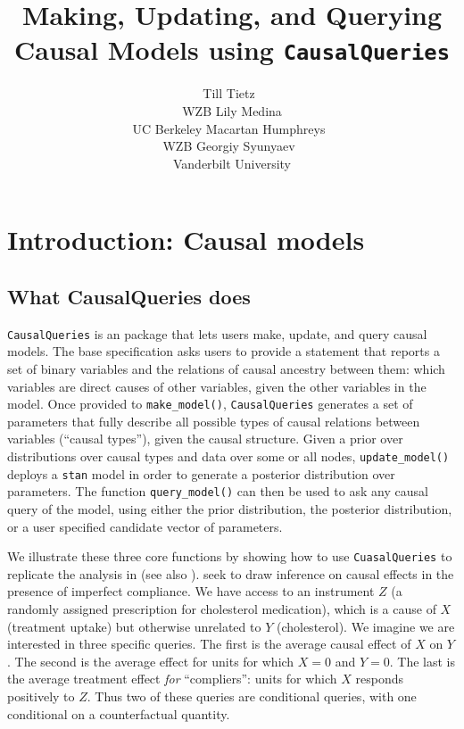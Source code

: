 \documentclass[
  11pt,
  article]{jss}
\author{Till Tietz~\orcidlink{0000-0002-2916-9059}\\WZB \And Lily
Medina\\UC Berkeley \AND Macartan
Humphreys~\orcidlink{0000-0001-7029-2326}\\WZB \And Georgiy
Syunyaev~\orcidlink{0000-0002-4391-6313}\\Vanderbilt University}
\title{Making, Updating, and Querying Causal Models using
\texttt{CausalQueries}}
\begin{document}
\maketitle
\hypertarget{sec-intro}{%
\section{Introduction: Causal models}\label{sec-intro}}

\hypertarget{what-causalqueries-does}{%
\subsection{What CausalQueries does}\label{what-causalqueries-does}}

\texttt{CausalQueries} is an  package that lets users make,
update, and query causal models. The base specification asks users to
provide a statement that reports a set of binary variables and the
relations of causal ancestry between them: which variables are direct
causes of other variables, given the other variables in the model. Once
provided to \texttt{make\_model()}, \texttt{CausalQueries} generates a
set of parameters that fully describe all possible types of causal
relations between variables (``causal types''), given the causal
structure. Given a prior over distributions over causal types and data
over some or all nodes, \texttt{update\_model()} deploys a \texttt{stan}
model in order to generate a posterior distribution over parameters. The
function \texttt{query\_model()} can then be used to ask any causal
query of the model, using either the prior distribution, the posterior
distribution, or a user specified candidate vector of parameters.

We illustrate these three core functions by showing how to use
\texttt{CuasalQueries} to replicate the analysis in
\citet{chickering1996clinician} (see also \citet{ii2023}).
\citet{chickering1996clinician} seek to draw inference on causal effects
in the presence of imperfect compliance. We have access to an instrument
\(Z\) (a randomly assigned prescription for cholesterol medication),
which is a cause of \(X\) (treatment uptake) but otherwise unrelated to
\(Y\) (cholesterol). We imagine we are interested in three specific
queries. The first is the average causal effect of \(X\) on \(Y\). The
second is the average effect for units for which \(X=0\) and \(Y=0\).
The last is the average treatment effect \emph{for} ``compliers'': units
for which \(X\) responds positively to \(Z\). Thus two of these queries
are conditional queries, with one conditional on a counterfactual
quantity.
\end{document}
